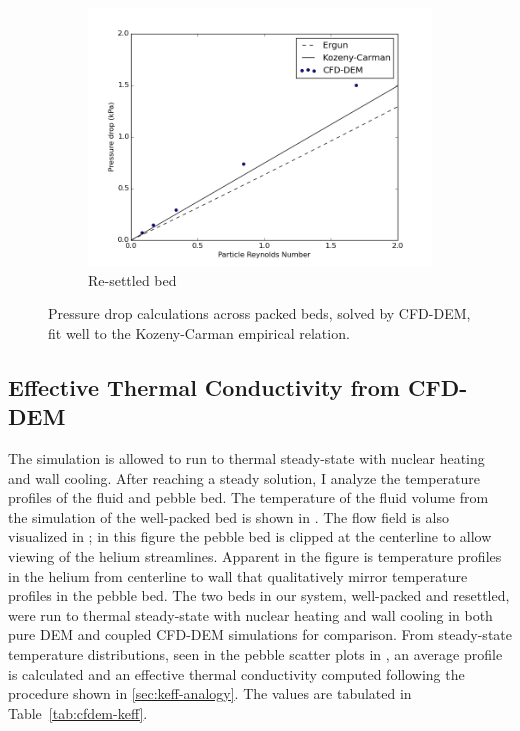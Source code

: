 \begin{figure}
        \begin{subfigure}[b]{0.7\textwidth}
                \includegraphics[width=\textwidth]{figures/pressureDrops-evap.png}
                \caption{Re-settled bed}
                \label{fig:pressure-drop-evap}
        \end{subfigure}
        \caption{Pressure drop calculations across packed beds, solved by CFD-DEM, fit well to the Kozeny-Carman empirical relation.}\label{fig:cfdem-pressure-drop}
\end{figure}



\subsection{Effective Thermal Conductivity from CFD-DEM}\label{sec:cfd-dem-effective-conductivity}

The simulation is allowed to run to thermal steady-state with nuclear heating and wall cooling. After reaching a steady solution, I analyze the temperature profiles of the fluid and pebble bed. The temperature of the fluid volume from the simulation of the well-packed bed is shown in . The flow field is also visualized in ; in this figure the pebble bed is clipped at the centerline to allow viewing of the helium streamlines. Apparent in the figure is temperature profiles in the helium from centerline to wall that qualitatively mirror temperature profiles in the pebble bed. The two beds in our system, well-packed and resettled, were run to thermal steady-state with nuclear heating and wall cooling in both pure DEM and coupled CFD-DEM simulations for comparison. From steady-state temperature distributions, seen in the pebble scatter plots in , an average profile is calculated and an effective thermal conductivity computed following the procedure shown in \cref{sec:keff-analogy}. The values are tabulated in Table~\ref{tab:cfdem-keff}. 

